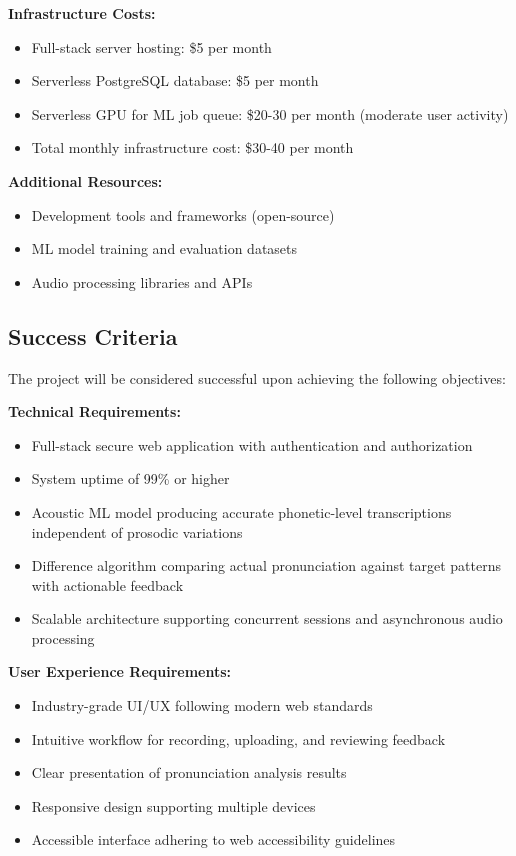 \documentclass[a4paper,12pt]{report}
\begin{document}
\textbf{Infrastructure Costs:}
\begin{itemize}
    \item Full-stack server hosting: \$5 per month
    \item Serverless PostgreSQL database: \$5 per month
    \item Serverless GPU for ML job queue: \$20-30 per month (moderate user activity)
    \item Total monthly infrastructure cost: \$30-40 per month
\end{itemize}

\textbf{Additional Resources:}
\begin{itemize}
    \item Development tools and frameworks (open-source)
    \item ML model training and evaluation datasets
    \item Audio processing libraries and APIs
\end{itemize}

\subsection{Success Criteria}
The project will be considered successful upon achieving the following objectives:

\textbf{Technical Requirements:}
\begin{itemize}
    \item Full-stack secure web application with authentication and authorization
    \item System uptime of 99\% or higher
    \item Acoustic ML model producing accurate phonetic-level transcriptions independent of prosodic variations
    \item Difference algorithm comparing actual pronunciation against target patterns with actionable feedback
    \item Scalable architecture supporting concurrent sessions and asynchronous audio processing
\end{itemize}

\textbf{User Experience Requirements:}
\begin{itemize}
    \item Industry-grade UI/UX following modern web standards
    \item Intuitive workflow for recording, uploading, and reviewing feedback
    \item Clear presentation of pronunciation analysis results
    \item Responsive design supporting multiple devices
    \item Accessible interface adhering to web accessibility guidelines
\end{itemize}
\end{document}
